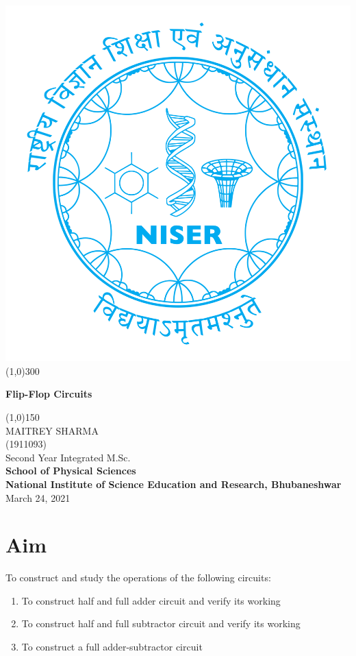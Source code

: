 \begin{titlepage}
\begin{center}
\includegraphics[scale=0.15]{Documents/niser.png}
\line(1,0){300}\\
[2mm]
\begin{large}
\textbf{\huge Flip-Flop Circuits}\\ 
\end{large}
\line(1,0){150}\\
[5cm]
\large MAITREY SHARMA\\
\small (1911093)\\
[4.5cm]
Second Year Integrated M.Sc.\\
\textbf{School of Physical Sciences}\\
\textbf{National Institute of Science Education and Research, Bhubaneshwar}\\
\small March 24, 2021
\end{center} 
\end{titlepage}
\newpage
\section{Aim}
\noindent
To construct and study the operations of the following circuits:
\begin{enumerate}
    \item To construct half and full adder circuit and verify its working
    \item To construct half and full subtractor circuit and verify its working
    \item To construct a full adder-subtractor circuit
\end{enumerate}
